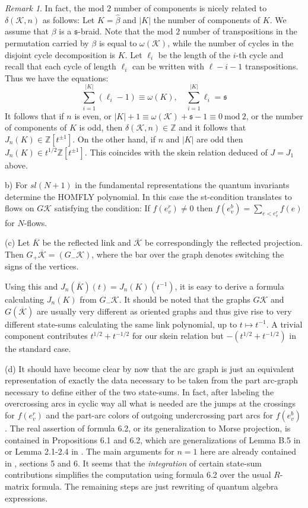 \documentclass[11pt]{article}
\theoremstyle{definition}
\theoremstyle{remark}
\newtheorem*{rem}{Remark}
\theoremstyle{remark}
\begin{document}
\begin{rem}
In fact, the mod $2$ number of components is nicely related to $\delta (\mathcal{K},n)$ as follows: Let $K=\hat{\beta }$ and $|K|$ the number of components of $K$. We assume that $\beta $ is a $\mathfrak{s}$-braid. Note that the mod $2$ number of transpositions in the permutation carried by $\beta $ is equal to $\omega (\mathcal{K})$, while the number of cycles in the disjoint cycle decomposition is $K$. Let $\ell_i$ be the length of the $i$-th cycle and recall that each cycle of length $\ell_i$ can be written with $\ell-i-1$ transpositions. Thus we have the equations:
$$\sum_{i=1}^{|K|}(\ell_i-1)\equiv \omega (K), \quad \sum_{i=1}^{|K|}\ell_i=\mathfrak{s}$$
It follows that if $n$ is even, or $|K|+1\equiv \omega (\mathcal{K})+\mathfrak{s}-1\equiv 0\ \textrm{mod}\ 2$, or the number of components of $K$ is odd, then $\delta (\mathcal{K},n)\in \mathbb{Z}$ and it follows that 
$J_n(K)\in \mathbb{Z}[t^{\pm 1}]$. On the other hand, if $n$ and $|K|$ are odd then $J_n(K)\in t^{1/2}\mathbb{Z}[t^{\pm 1}]$.
This coincides with the skein relation deduced of $J=J_1$ above. 

\noindent b) For $sl(N+1)$ in the fundamental representations the quantum invariants determine the HOMFLY polynomial. In this case the \textrm{st}-condition translates to flows on $G\mathcal{K}$ satisfying the condition: If $f(e_v^r)\neq 0$ then $f(e_v^b)=\sum_{e<e_v^r}f(e)$ for $N$-flows.

\noindent (c) Let $\overline{K}$ be the reflected link and $\overline{\mathcal{K}}$ be correspondingly the reflected projection. 
Then $G_+\overline{\mathcal{K}}=\overline{(G_-\mathcal{K})}$, where the bar over the graph denotes switching the signs of the vertices.

Using this and $J_n(\overline{K})(t)=J_n(K)(t^{-1})$, it is easy to derive a formula calculating $J_n(K)$ from $G_-\mathcal{K}$.
It should be noted that the graphs $G\mathcal{K}$ and $G(\overline{\mathcal{K}})$ are usually very different as oriented graphs 
and thus give rise to very different state-sums calculating the same link polynomial, up to $t\mapsto t^{-1}$.
A trivial component contributes $t^{1/2}+t^{-1/2}$ for our skein relation but $-(t^{1/2}+t^{-1/2})$ in the standard case. 

\noindent (d) It should have become clear by now that the arc graph is just an equivalent representation of exactly the data necessary to be taken from the part arc-graph necessary to define either of the two state-sums. In fact, after labeling the overcrossing arcs in cyclic way all what is needed are the jumps at the crossings for $f(e_v^r)$ and the part-arc colors of outgoing undercrossing part arcs for $f(e_v^b)$. The real assertion of formula 6.2, or its generalization to Morse projection, is contained in Propositions 6.1 and 6.2, which are generalizations of Lemma B.5 in \cite{GL} or Lemma 2.1-2.4 in \cite{Li}. The main arguments for $n=1$ here are already contained in \cite{T}, sections 5 and 6. It seems that the \textit{integration} of certain state-sum contributions simplifies the computation using formula 6.2 over the usual $R$-matrix formula. The remaining steps are just rewriting of quantum algebra expressions.
\end{rem}
\end{document}
